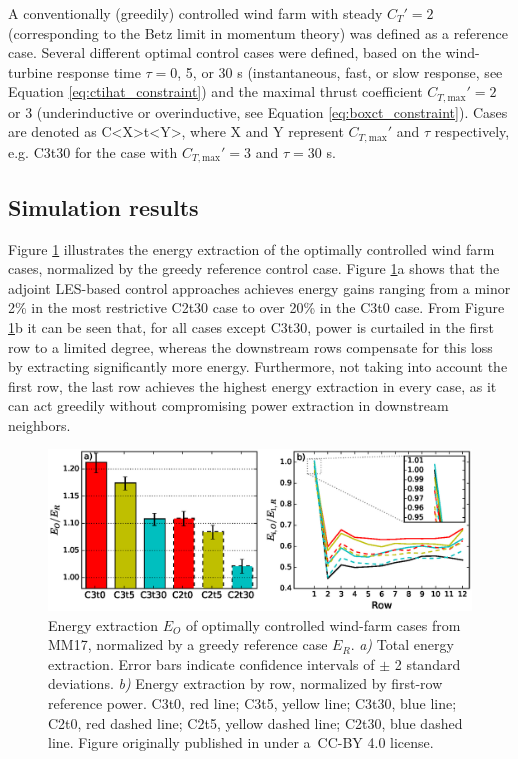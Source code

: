 \documentclass[wes, manuscript]{copernicus}
\newcommand{\ctmax}{C_{T,\text{max}}'}
\begin{document}
A conventionally (greedily) controlled wind farm with steady $C_T' = 2$ (corresponding to the Betz limit in momentum theory) was defined as a reference case. Several different optimal control cases were defined, based on the wind-turbine response time $\tau = $0, 5, or 30 s (instantaneous, fast, or slow response, see Equation \ref{eq:ctihat_constraint}) and the maximal thrust coefficient $\ctmax = 2$ or 3 (underinductive or overinductive, see Equation \ref{eq:boxct_constraint}). Cases are denoted as C<X>t<Y>, where X and Y represent $\ctmax$ and $\tau$ respectively, e.g. C3t30  for the case with $\ctmax = 3$ and $\tau = 30$ s. 

\subsection{Simulation results}

Figure \ref{fig:power_MM17} illustrates the energy extraction of the optimally controlled wind farm cases, normalized by the greedy reference control case. Figure \ref{fig:power_MM17}a shows that the adjoint LES-based control approaches achieves energy gains ranging from a minor 2\% in the most restrictive C2t30 case to over 20\% in the C3t0 case. From Figure \ref{fig:power_MM17}b it can be seen that, for all cases except C3t30, power is curtailed in the first row to a limited degree, whereas the downstream rows compensate for this loss by extracting significantly more energy. Furthermore, not taking into account the first row, the last row achieves the highest energy extraction in every case, as it can act greedily without compromising power extraction in downstream neighbors. 

\begin{figure}
	\includegraphics[width=\textwidth]{power_MM17}
	\caption{Energy extraction $E_O$ of optimally controlled wind-farm cases from MM17, normalized by a greedy reference case $E_R$. \emph{a)} Total energy extraction. Error bars indicate confidence intervals of $\pm$ 2 standard deviations. \emph{b)} Energy extraction by row, normalized by first-row reference power. C3t0, red line; C3t5, yellow line; C3t30, blue line; C2t0, red dashed line; C2t5, yellow dashed line; C2t30, blue dashed line. Figure originally published in \cite{munters2017optimal} under a~CC-BY 4.0 license.\label{fig:power_MM17}}
\end{figure}
\end{document}
